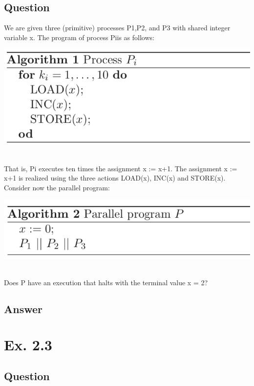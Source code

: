 \documentclass[12pt]{article}
\begin{document}
\subsection*{Question}
We are given three (primitive) processes P1,P2, and P3 with shared integer variable x. The program of process Piis as follows:\\
\begin{centering}
	\includegraphics*[width=\linewidth]{algo1.png}
\end{centering}
\\
That is, Pi executes ten times the assignment x := x+1. The assignment x := x+1 is realized using the three actions LOAD(x), INC(x) and STORE(x). Consider now the parallel program:\\
\begin{centering}
	\includegraphics*[width=\linewidth]{algo2.png}
\end{centering}
\\
Does P have an execution that halts with the terminal value x = 2?

\subsection*{Answer}

\newpage
\section*{Ex. 2.3}
\subsection*{Question}
\end{document}
